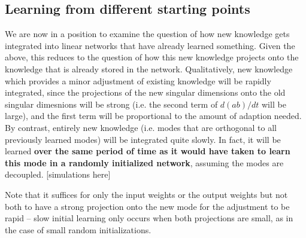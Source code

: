 \documentclass{article}
\begin{document}
\subsection{Learning from different starting points}
We are now in a position to examine the question of how new knowledge gets integrated into linear networks that have already learned something. Given the above, this reduces to the question of how this new knowledge projects onto the knowledge that is already stored in the network. Qualitatively, new knowledge which provides a minor adjustment of existing knowledge will be rapidly integrated, since the projections of the new singular dimensions onto the old singular dimesnions will be strong (i.e. the second term of $d(ab)/dt$ will be large), and the first term will be proportional to the amount of adaption needed. By contrast, entirely new knowledge (i.e. modes that are orthogonal to all previously learned modes) will be integrated quite slowly. In fact, it will be learned \textbf{over the same period of time as it would have taken to learn this mode in a randomly initialized network}, assuming the modes are decoupled. {\color{red}[simulations here]} \par
Note that it suffices for only the input weights or the output weights but not both to have a strong projection onto the new mode for the adjustment to be rapid -- slow initial learning only occurs when both projections are small, as in the case of small random initializations. \par
\end{document}
